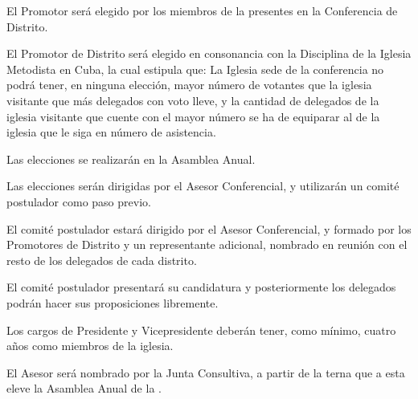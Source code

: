 \article
El Promotor será elegido por los miembros de la \LMJ{} presentes en la Conferencia de Distrito.

\article
El Promotor de Distrito será elegido en consonancia con la Disciplina de la Iglesia Metodista en Cuba, la cual estipula que: La Iglesia sede de la conferencia no podrá tener, en ninguna elección, mayor número de votantes que la iglesia visitante que más delegados con voto lleve, y la cantidad de delegados de la iglesia visitante que cuente con el mayor número se ha de equiparar al de la iglesia que le siga en número de asistencia.


\article
Las elecciones se realizarán en la Asamblea Anual.

\article
Las elecciones serán dirigidas por el Asesor Conferencial, y utilizarán un comité postulador como paso previo.

\article
El comité postulador estará dirigido por el Asesor Conferencial, y formado por los Promotores de Distrito y un representante adicional, nombrado en reunión con el resto de los delegados de cada distrito.

\article
El comité postulador presentará su candidatura y posteriormente los delegados podrán hacer sus proposiciones libremente.

\article
Los cargos de Presidente y Vicepresidente deberán tener, como mínimo, cuatro años como miembros de la iglesia.

\article
El Asesor será nombrado por la Junta Consultiva, a partir de la terna que a esta eleve la Asamblea Anual de la \LMJ{}.
